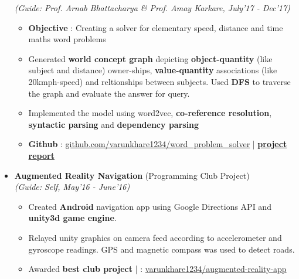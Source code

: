 \documentclass[a4paper,10pt]{article}
\newcommand{\isep}{-2 pt}
\begin{document}
\begin{itemize}
 \emph{(Guide: Prof. Arnab Bhattacharya \& Prof. Amay Karkare, July'17 - Dec'17)} \\[-0.6cm]
	\begin{itemize}\itemsep \isep
	\item \textbf{Objective} : Creating a solver for elementary speed, distance and time maths word problems 
	\item Generated \textbf{ world concept graph} depicting \textbf{object-quantity} (like subject and distance) owner-ships, \textbf{value-quantity} associations (like 20kmph-speed) and reltionships between subjects. Used \textbf{DFS} to traverse the graph and evaluate the answer for query.
	\item Implemented the model using word2vec, \textbf{co-reference resolution}, \textbf{syntactic parsing} and \textbf{dependency parsing}

	\item \textbf{Github} \faGithub  : \href{https://github.com/varunkhare1234/word_problem_solver }{github.com/varunkhare1234/word\_problem\_solver} | \href{http://home.iitk.ac.in/~varun/word_problem_report.pdf }{\textbf{project report} \faExternalLink}
	\end{itemize}

\item \textbf{Augmented Reality Navigation} (Programming Club Project) \\
 \emph{(Guide: Self, May'16 - June'16)} \\[-0.6cm]
	\begin{itemize}\itemsep \isep
	\item Created \textbf{Android} navigation app using Google Directions API and \textbf{unity3d game engine}.
	\item Relayed unity graphics on camera feed according to accelerometer and gyroscope readings. GPS and magnetic compass was used to detect roads.
	\item Awarded \textbf{best club project} | \faGithub : \href{https://github.com/varunkhare1234/augmented-reality-app}{varunkhare1234/augmented-reality-app}
	\end{itemize}

\end{itemize}	
\end{document}
